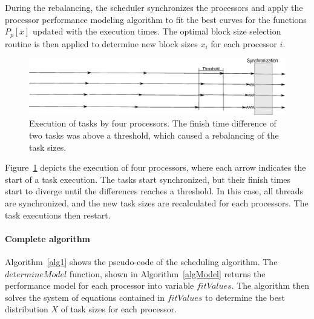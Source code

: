 \documentclass[journal]{IEEEtran}
\begin{document}
During the rebalancing, the scheduler synchronizes the processors and apply the
processor performance modeling algorithm to fit the best curves for the
functions $P_p[x]$ updated with the execution times. The optimal block size
selection routine is then applied to determine new block sizes $x_i$ for each
processor $i$.

\begin{figure}[!t]
	\centering
			\includegraphics[scale=0.24]{DiagramaArtigo.eps}
	\caption{Execution of tasks by four processors. The finish time
          difference of two tasks was above a threshold, which caused a
          rebalancing of the task sizes.}
	\label{fig:Diagrama}
\end{figure}


Figure~\ref{fig:Diagrama} depicts the execution of four processors, where
each arrow indicates the start of a task execution. The tasks start
synchronized, but their finish times start to diverge until the differences
reaches a threshold. In this case, all threads are synchronized, and the new
task sizes are recalculated for each processors. The task executions then
restart.

\vspace{0.2cm}
\paragraph*{Complete algorithm} 

Algorithm~\ref{alg1} shows the pseudo-code of the scheduling algorithm. The
$determineModel$ function, shown in Algorithm~\ref{algModel} returns the
performance model for each processor into variable $fitValues$. The algorithm
then solves the system of equations contained in $fitValues$ to determine the
best distribution $X$ of task sizes for each processor.
\end{document}
